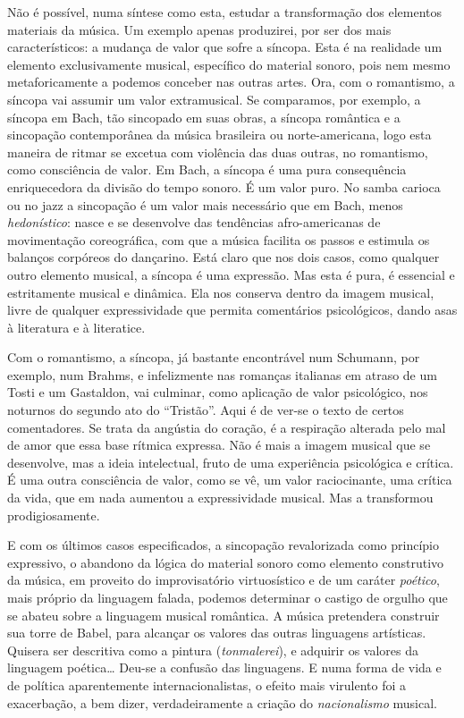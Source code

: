 Não é possível, numa síntese como esta, estudar a transformação dos
elementos materiais da música. Um exemplo apenas produzirei, por ser dos
mais característicos: a mudança de valor que sofre a síncopa. Esta é na
realidade um elemento exclusivamente musical, específico do material
sonoro, pois nem mesmo metaforicamente a podemos conceber nas outras
artes. Ora, com o romantismo, a síncopa vai assumir um valor
extramusical. Se comparamos, por exemplo, a síncopa em Bach, tão
sincopado em suas obras, a síncopa romântica e a sincopação
contemporânea da música brasileira ou norte-americana, logo esta maneira
de ritmar se excetua com violência das duas outras, no romantismo, como
consciência de valor. Em Bach, a síncopa é uma pura consequência
enriquecedora da divisão do tempo sonoro. É um valor puro. No samba
carioca ou no jazz a sincopação é um valor mais necessário que em Bach,
menos \textit{hedonístico}: nasce e se desenvolve das tendências
afro-americanas de movimentação coreográfica, com que a música facilita
os passos e estimula os balanços corpóreos do dançarino. Está claro que
nos dois casos, como qualquer outro elemento musical, a síncopa é uma
expressão. Mas esta é pura, é essencial e estritamente musical e
dinâmica. Ela nos conserva dentro da imagem musical, livre de qualquer
expressividade que permita comentários psicológicos, dando asas à
literatura e à literatice.

Com o romantismo, a síncopa, já bastante encontrável num Schumann, por
exemplo, num Brahms, e infelizmente nas romanças italianas em atraso de
um Tosti e um Gastaldon, vai culminar, como aplicação de valor
psicológico, nos noturnos do segundo ato do ``Tristão''. Aqui é de ver-se o
texto de certos comentadores. Se trata da angústia do coração, é a
respiração alterada pelo mal de amor que essa base rítmica expressa. Não
é mais a imagem musical que se desenvolve, mas a ideia intelectual,
fruto de uma experiência psicológica e crítica. É uma outra consciência
de valor, como se vê, um valor raciocinante, uma crítica da vida, que em
nada aumentou a expressividade musical. Mas a transformou
prodigiosamente.

E com os últimos casos especificados, a sincopação revalorizada como
princípio expressivo, o abandono da lógica do material sonoro como
elemento construtivo da música, em proveito do improvisatório
virtuosístico e de um caráter \textit{poético}, mais próprio da linguagem
falada, podemos determinar o castigo de orgulho que se abateu sobre a
linguagem musical romântica. A música pretendera construir sua torre de
Babel, para alcançar os valores das outras linguagens artísticas.
Quisera ser descritiva como a pintura (\textit{tonmalerei}), e adquirir os
valores da linguagem poética\ldots{} Deu-se a confusão das linguagens. E numa
forma de vida e de política aparentemente internacionalistas, o efeito
mais virulento foi a exacerbação, a bem dizer, verdadeiramente a criação
do \textit{nacionalismo} musical.

